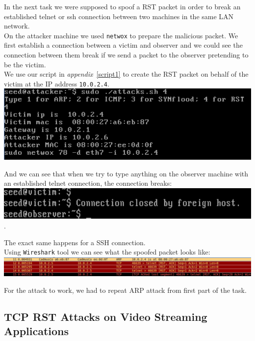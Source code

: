 \documentclass[12pt, a4paper]{article}
\begin{document}
In the next task we were supposed to spoof a RST packet in order to break an established telnet or ssh connection between two machines in the same LAN network.\\

On the attacker machine we used \texttt{netwox} to prepare the malicious packet. We first establish a connection between a victim and observer and we could see the connection between them break if we send a packet to the observer pretending to be the victim.\\

We use our script in \emph{appendix}~\ref{script1} to create the RST packet on behalf of the victim at the IP address \texttt{10.0.2.4}.\\

\includegraphics[width=.95\textwidth]{gfx/rst-attack.png}

And we can see that when we try to type anything on the observer machine with an established telnet connection, the connection breaks:\\

\includegraphics[width=.95\textwidth]{gfx/rst-reset.png}.

The exact same happens for a SSH connection.\\

Using \texttt{Wireshark} tool we can see what the spoofed packet looks like:\\

\includegraphics[width=.95\textwidth]{gfx/rst-spoofed.png}

For the attack to work, we had to repeat ARP attack from first part of the task.

\subsection{TCP RST Attacks on Video Streaming Applications}
\end{document}

